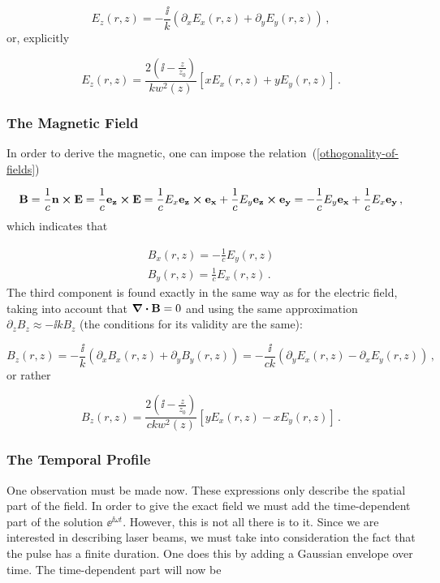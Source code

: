 \documentclass[12pt, class=report, crop=false]{standalone}
\begin{document}
\begin{equation}
  E_z (r,z) = - \frac{\ii}{k} \left( \partial_x E_x (r,z) +\partial_y E_y (r,z)\right)\,,
\end{equation}
or, explicitly

\begin{equation}
  E_z (r,z) = \frac{2 \left(\ii -\frac{z}{z_0}\right)}{kw^2 (z)} [xE_x (r,z) +yE_y(r,z)]\,.
\end{equation}

\subsubsection{The Magnetic Field}
In order to derive the magnetic, one can impose the relation~(\ref{othogonality-of-fields})

\begin{equation*}
  \vb{B} = \frac{1}{c} \vb{n} \cp\vb{E} = \frac{1}{c} \vb{e_z} \cp\vb{E} = \frac{1}{c} E_x \vb{e_z} \cp\vb{e_x} + \frac{1}{c} E_y \vb{e_z} \cp\vb{e_y} = - \frac{1}{c} E_y \vb{e_x}+\frac{1}{c} E_x \vb{e_y} \,,
\end{equation*}
which indicates that

\begin{subequations}
  \begin{align}
    B_x(r,z) = -\frac{1}{c}E_y(r,z)\\
    B_y(r,z) = \frac{1}{c}E_x(r,z)\,.
  \end{align}
\end{subequations}
The third component is found exactly in the same way as for the electric field, taking into account that \(\div{\vb{B}}=0\) and using the same approximation \(\partial_z B_z \approx -\ii k B_z\) (the conditions for its validity are the same):

\begin{equation}
  B_z (r,z) = - \frac{\ii}{k} \left( \partial_x B_x (r,z) +\partial_y B_y (r,z)\right) = -\frac{\ii}{ck} \left( \partial_y E_x (r,z) - \partial_x E_y (r,z) \right)\,,
\end{equation}
or rather

\begin{equation}
  B_z (r,z) = \frac{2 \left(\ii -\frac{z}{z_0}\right)}{ckw^2 (z)} [yE_x (r,z) -xE_y(r,z)]\,.
\end{equation}

\subsubsection{The Temporal Profile}
One observation must be made now. These expressions only describe the spatial part of the field. In order to give the exact field we must add the time-dependent part of the solution \(\ee^{\ii \omega t}\). However, this is not all there is to it. Since we are interested in describing laser beams, we must take into consideration the fact that the pulse has a finite duration. One does this by adding a Gaussian envelope over time. The time-dependent part will now be
\end{document}
